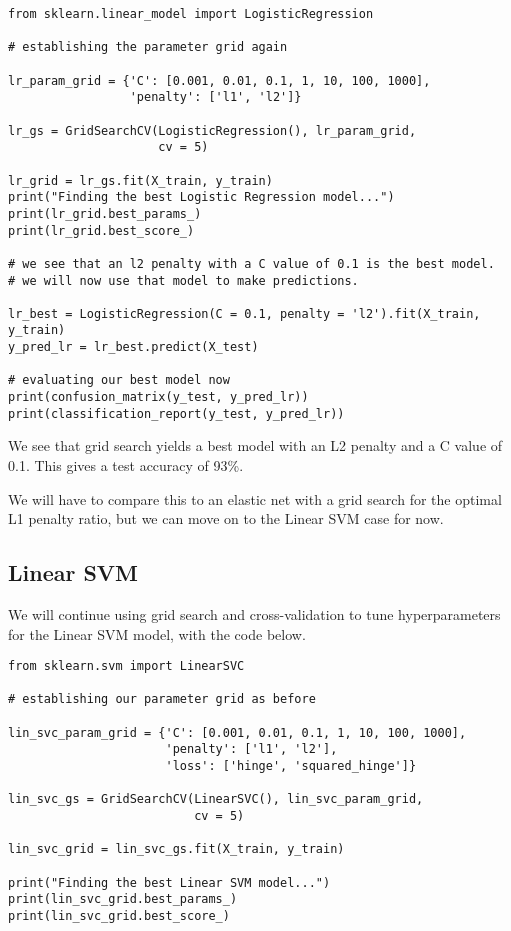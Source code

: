 \documentclass[12pt, letterpaper]{article}
\begin{document}
\begin{verbatim} 
from sklearn.linear_model import LogisticRegression 

# establishing the parameter grid again 

lr_param_grid = {'C': [0.001, 0.01, 0.1, 1, 10, 100, 1000],
                 'penalty': ['l1', 'l2']} 

lr_gs = GridSearchCV(LogisticRegression(), lr_param_grid, 
                     cv = 5)

lr_grid = lr_gs.fit(X_train, y_train) 
print("Finding the best Logistic Regression model...") 
print(lr_grid.best_params_)
print(lr_grid.best_score_)

# we see that an l2 penalty with a C value of 0.1 is the best model.
# we will now use that model to make predictions. 

lr_best = LogisticRegression(C = 0.1, penalty = 'l2').fit(X_train, y_train) 
y_pred_lr = lr_best.predict(X_test) 

# evaluating our best model now 
print(confusion_matrix(y_test, y_pred_lr)) 
print(classification_report(y_test, y_pred_lr)) 
\end{verbatim}

We see that grid search yields a best model with an L2 penalty and a C value of 0.1. This gives a test accuracy of 93\%. 

We will have to compare this to an elastic net with a grid search for the optimal L1 penalty ratio, but we can move on to the Linear SVM case for now. 

\subsection{Linear SVM}

We will continue using grid search and cross-validation to tune hyperparameters for the Linear SVM model, with the code below. 

\begin{verbatim}
from sklearn.svm import LinearSVC  

# establishing our parameter grid as before 

lin_svc_param_grid = {'C': [0.001, 0.01, 0.1, 1, 10, 100, 1000], 
                      'penalty': ['l1', 'l2'], 
                      'loss': ['hinge', 'squared_hinge']}

lin_svc_gs = GridSearchCV(LinearSVC(), lin_svc_param_grid, 
                          cv = 5)

lin_svc_grid = lin_svc_gs.fit(X_train, y_train) 

print("Finding the best Linear SVM model...") 
print(lin_svc_grid.best_params_) 
print(lin_svc_grid.best_score_) 
\end{verbatim}
\end{document}
